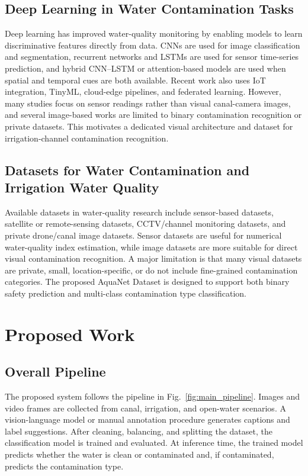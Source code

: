 \documentclass[journal]{IEEEtran}
\newcommand{\dataset}{AquaNet Dataset}
\begin{document}
\subsection{Deep Learning in Water Contamination Tasks}
\label{subsec:deep_learning_methods}
Deep learning has improved water-quality monitoring by enabling models to learn discriminative features directly from data. CNNs are used for image classification and segmentation, recurrent networks and LSTMs are used for sensor time-series prediction, and hybrid CNN--LSTM or attention-based models are used when spatial and temporal cues are both available. Recent work also uses IoT integration, TinyML, cloud-edge pipelines, and federated learning. However, many studies focus on sensor readings rather than visual canal-camera images, and several image-based works are limited to binary contamination recognition or private datasets. This motivates a dedicated visual architecture and dataset for irrigation-channel contamination recognition.

\subsection{Datasets for Water Contamination and Irrigation Water Quality}
\label{subsec:datasets_related_work}
Available datasets in water-quality research include sensor-based datasets, satellite or remote-sensing datasets, CCTV/channel monitoring datasets, and private drone/canal image datasets. Sensor datasets are useful for numerical water-quality index estimation, while image datasets are more suitable for direct visual contamination recognition. A major limitation is that many visual datasets are private, small, location-specific, or do not include fine-grained contamination categories. The proposed \dataset{} is designed to support both binary safety prediction and multi-class contamination type classification.

\section{Proposed Work}
\label{sec:proposed_work}

\subsection{Overall Pipeline}
\label{subsec:pipeline}
The proposed system follows the pipeline in Fig.~\ref{fig:main_pipeline}. Images and video frames are collected from canal, irrigation, and open-water scenarios. A vision-language model or manual annotation procedure generates captions and label suggestions. After cleaning, balancing, and splitting the dataset, the classification model is trained and evaluated. At inference time, the trained model predicts whether the water is clean or contaminated and, if contaminated, predicts the contamination type.
\end{document}
